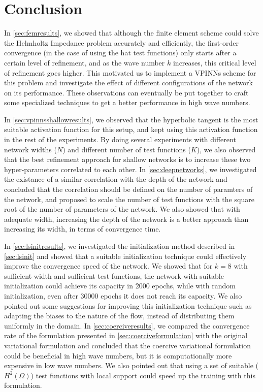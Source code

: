 \section{Conclusion}\label{sec:conclusion}
In \autoref{sec:femresults}, we showed that although the finite element scheme could solve the Helmholtz Impedance problem accurately and efficiently, the first-order convergence (in the case of using the hat test functions) only starts after a certain level of refinement, and as the wave number $k$ increases, this critical level of refinement goes higher. This motivated us to implement a VPINNs scheme for this problem and investigate the effect of different configurations of the network on its performance. These observations can eventually be put together to craft some specialized techniques to get a better performance in high wave numbers.

In \autoref{sec:vpinnsshallowresults}, we observed that the hyperbolic tangent is the most suitable activation function for this setup, and kept using this activation function in the rest of the experiments. By doing several experiments with different network widths ($N$) and different number of test functions ($K$), we also observed that the best refinement approach for shallow networks is to increase these two hyper-parameters correlated to each other. In \autoref{sec:deepnetworks}, we investigated the existance of a similar correlation with the depth of the network and concluded that the correlation should be defined on the number of paramters of the network, and proposed to scale the number of test functions with the square root of the number of parameters of the network. We also showed that with adequate width, increasing the depth of the network is a better approach than increasing its width, in terms of convergence time.

In \autoref{sec:lsinitresults}, we investigated the initialization method described in \autoref{sec:lsinit} and showed that a suitable initialization technique could effectively improve the convergence speed of the network. We showed that for $k=8$ with sufficient width and sufficient test functions, the network with suitable initialization could achieve its capacity in 2000 epochs, while with random initialization, even after 30000 epochs it does not reach its capacity. We also pointed out some suggestions for improving this initialization technique such as adapting the biases to the nature of the flow, instead of distributing them uniformly in the domain. In \autoref{sec:coerciveresults}, we compared the convergence rate of the formulation presented in \autoref{sec:coerciveformulation} with the original variational formulation and concluded that the coercive variational formulation could be beneficial in high wave numbers, but it is computationally more expensive in low wave numbers. We also pointed out that using a set of suitable ($H^2(\Omega)$) test functions with local support could speed up the training with this formulation.

